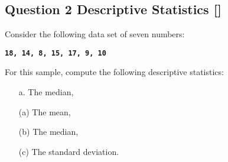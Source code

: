 \documentclass[a4paper,12pt]{article}
\begin{document}
\bigskip
\subsection*{Question 2 Descriptive Statistics []}

Consider the following data set of seven numbers:

\begin{center}
\textbf{\texttt{18, 14,  8, 15, 17,  9, 10 }}
\end{center}

\noindent For this sample, compute the following descriptive statistics:
\begin{itemize}
%
\item[a.]  The median,

\item[(a)]  The mean,

\item[(b)]  The median,

\item[(c)]  The standard deviation.
\end{itemize}

\newpage
\end{document}
